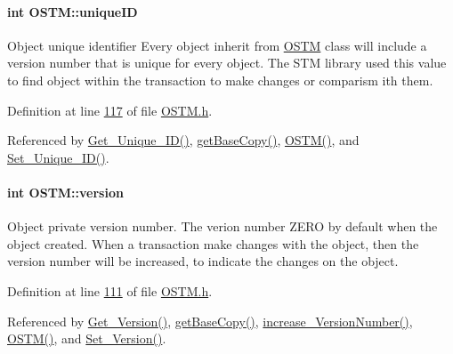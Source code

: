 \paragraph[{\texorpdfstring{unique\+ID}{uniqueID}}]{\setlength{\rightskip}{0pt plus 5cm}int O\+S\+T\+M\+::unique\+ID\hspace{0.3cm}{\ttfamily [private]}}\hypertarget{class_o_s_t_m_aa9fe59368b701af7f70befa23bd6901a_aa9fe59368b701af7f70befa23bd6901a}{}\label{class_o_s_t_m_aa9fe59368b701af7f70befa23bd6901a_aa9fe59368b701af7f70befa23bd6901a}
Object unique identifier Every object inherit from \hyperlink{class_o_s_t_m}{O\+S\+TM} class will include a version number that is unique for every object. The S\+TM library used this value to find object within the transaction to make changes or comparism ith them. 

Definition at line \hyperlink{_o_s_t_m_8h_source_l00117}{117} of file \hyperlink{_o_s_t_m_8h_source}{O\+S\+T\+M.\+h}.



Referenced by \hyperlink{_o_s_t_m_8cpp_source_l00082}{Get\+\_\+\+Unique\+\_\+\+I\+D()}, \hyperlink{_o_s_t_m_8h_source_l00051}{get\+Base\+Copy()}, \hyperlink{_o_s_t_m_8cpp_source_l00021}{O\+S\+T\+M()}, and \hyperlink{_o_s_t_m_8cpp_source_l00075}{Set\+\_\+\+Unique\+\_\+\+I\+D()}.

\paragraph[{\texorpdfstring{version}{version}}]{\setlength{\rightskip}{0pt plus 5cm}int O\+S\+T\+M\+::version\hspace{0.3cm}{\ttfamily [private]}}\hypertarget{class_o_s_t_m_a9a6ea36181be2db7f9082d77956511d7_a9a6ea36181be2db7f9082d77956511d7}{}\label{class_o_s_t_m_a9a6ea36181be2db7f9082d77956511d7_a9a6ea36181be2db7f9082d77956511d7}
Object private version number. The verion number Z\+E\+RO by default when the object created. When a transaction make changes with the object, then the version number will be increased, to indicate the changes on the object. 

Definition at line \hyperlink{_o_s_t_m_8h_source_l00111}{111} of file \hyperlink{_o_s_t_m_8h_source}{O\+S\+T\+M.\+h}.



Referenced by \hyperlink{_o_s_t_m_8cpp_source_l00100}{Get\+\_\+\+Version()}, \hyperlink{_o_s_t_m_8h_source_l00051}{get\+Base\+Copy()}, \hyperlink{_o_s_t_m_8cpp_source_l00108}{increase\+\_\+\+Version\+Number()}, \hyperlink{_o_s_t_m_8cpp_source_l00021}{O\+S\+T\+M()}, and \hyperlink{_o_s_t_m_8cpp_source_l00092}{Set\+\_\+\+Version()}.

